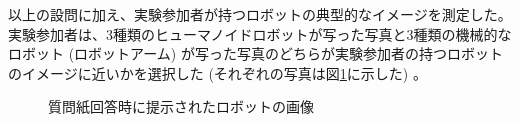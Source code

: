 \documentclass[a4j,12pt]{jreport}
\begin{document}
以上の設問に加え、実験参加者が持つロボットの典型的なイメージを測定した。
実験参加者は、3種類のヒューマノイドロボットが写った写真と3種類の機械的なロボット (ロボットアーム) が写った写真のどちらが実験参加者の持つロボットのイメージに近いかを選択した (それぞれの写真は図\ref{fig:Robots}に示した) 。


\begin{figure}[H]
  \centering
{}%
          \label{subfig:humanoid}
%
          \label{subfig:machine}
  \caption{質問紙回答時に提示されたロボットの画像}
  \label{fig:Robots}
\end{figure}
\end{document}

